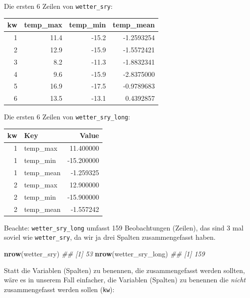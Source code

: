 \documentclass[]{book}
\newenvironment{Shaded}{\begin{snugshade}}{\end{snugshade}}
\newcommand{\CommentTok}[1]{\textcolor[rgb]{0.56,0.35,0.01}{\textit{#1}}}
\newcommand{\KeywordTok}[1]{\textcolor[rgb]{0.13,0.29,0.53}{\textbf{#1}}}
\newcommand{\NormalTok}[1]{#1}
\newcommand{\OperatorTok}[1]{\textcolor[rgb]{0.81,0.36,0.00}{\textbf{#1}}}
\newcommand{\StringTok}[1]{\textcolor[rgb]{0.31,0.60,0.02}{#1}}
\begin{document}
Die ersten 6 Zeilen von \texttt{wetter\_sry}:

\begin{tabular}{r|r|r|r}
\hline
kw & temp\_max & temp\_min & temp\_mean\\
\hline
1 & 11.4 & -15.2 & -1.2593254\\
\hline
2 & 12.9 & -15.9 & -1.5572421\\
\hline
3 & 8.2 & -11.3 & -1.8832341\\
\hline
4 & 9.6 & -15.9 & -2.8375000\\
\hline
5 & 16.9 & -17.5 & -0.9789683\\
\hline
6 & 13.5 & -13.1 & 0.4392857\\
\hline
\end{tabular}

Die ersten 6 Zeilen von \texttt{wetter\_sry\_long}:

\begin{tabular}{r|l|r}
\hline
kw & Key & Value\\
\hline
1 & temp\_max & 11.400000\\
\hline
1 & temp\_min & -15.200000\\
\hline
1 & temp\_mean & -1.259325\\
\hline
2 & temp\_max & 12.900000\\
\hline
2 & temp\_min & -15.900000\\
\hline
2 & temp\_mean & -1.557242\\
\hline
\end{tabular}

Beachte: \texttt{wetter\_sry\_long} umfasst 159 Beobachtungen (Zeilen), das sind 3 mal soviel wie \texttt{wetter\_sry}, da wir ja drei Spalten zusammengefasst haben.

\begin{Shaded}
\begin{Highlighting}[]
\KeywordTok{nrow}\NormalTok{(wetter_sry)}
\CommentTok{## [1] 53}
\KeywordTok{nrow}\NormalTok{(wetter_sry_long)}
\CommentTok{## [1] 159}
\end{Highlighting}
\end{Shaded}

Statt die Variablen (Spalten) zu benennen, die zusammengefasst werden sollten, wäre es in unserem Fall einfacher, die Variablen (Spalten) zu benennen die \emph{nicht} zusammengefasst werden sollen (\texttt{kw}):

\begin{Shaded}
\end{Shaded}
\end{document}
